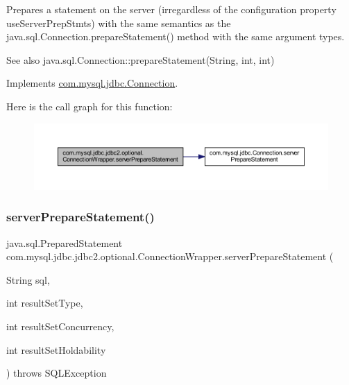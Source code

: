 Prepares a statement on the server (irregardless of the configuration property \textquotesingle{}use\+Server\+Prep\+Stmts\textquotesingle{}) with the same semantics as the java.\+sql.\+Connection.\+prepare\+Statement() method with the same argument types.

\begin{DoxySeeAlso}{See also}
java.\+sql.\+Connection\+::prepare\+Statement(\+String, int, int) 
\end{DoxySeeAlso}


Implements \mbox{\hyperlink{interfacecom_1_1mysql_1_1jdbc_1_1_connection_acda6552c537e45e1d46a1d8e21beefe3}{com.\+mysql.\+jdbc.\+Connection}}.

Here is the call graph for this function\+:
\nopagebreak
\begin{figure}[H]
\begin{center}
\leavevmode
\includegraphics[width=350pt]{classcom_1_1mysql_1_1jdbc_1_1jdbc2_1_1optional_1_1_connection_wrapper_a46f978f9cb59c27e48921735fd605245_cgraph}
\end{center}
\end{figure}
\mbox{\label{classcom_1_1mysql_1_1jdbc_1_1jdbc2_1_1optional_1_1_connection_wrapper_aa5144167983b1257bdf575d8349e1fbe}} 
\subsubsection{\texorpdfstring{server\+Prepare\+Statement()}{serverPrepareStatement()}\hspace{0.1cm}{\footnotesize\ttfamily [4/6]}}
{\footnotesize\ttfamily java.\+sql.\+Prepared\+Statement com.\+mysql.\+jdbc.\+jdbc2.\+optional.\+Connection\+Wrapper.\+server\+Prepare\+Statement (\begin{DoxyParamCaption}\item[{String}]{sql,  }\item[{int}]{result\+Set\+Type,  }\item[{int}]{result\+Set\+Concurrency,  }\item[{int}]{result\+Set\+Holdability }\end{DoxyParamCaption}) throws S\+Q\+L\+Exception}

